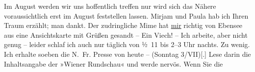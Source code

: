 \pstart
           Im August werden wir uns hoffentlich treffen nur wird sich das Nähere
               voraussichtlich erst im August feststellen lassen. Mirjam und Paula hab ich
               Ihren Traum erzählt; man {\pb}dankt.
               Der zudringliche Mime hat
                  \uline{mir} richtig von Ebensee aus eine Ansichtskarte mit Grüßen gesandt – Ein Viech! – Ich
               arbeite, aber nicht genug – leider schlaf ich auch nur täglich von ½ 11
               bis 2–3 Uhr nachts. Zu wenig. Ich erhalte {\pb}soeben die N. Fr. Presse von heute – (Sonntag 3/VII){[}.{]} Lese darin die Inhaltsangabe der »Wiener Rundschau« und werde nervös. Wenn Sie die
